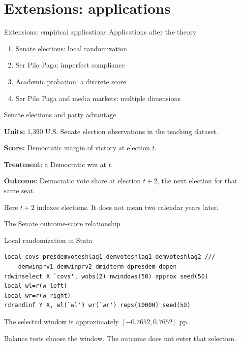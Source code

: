 \section{Extensions: applications}
\begin{frame}[plain]{Extensions: empirical applications}
\Large Applications after the theory
\vspace{1em}\normalsize
\begin{enumerate}\setlength{\itemsep}{.65em}
\item Senate elections: local randomization
\item Ser Pilo Paga: imperfect compliance
\item Academic probation: a discrete score
\item Ser Pilo Paga and media markets: multiple dimensions
\end{enumerate}
\end{frame}

\begin{frame}{Senate elections and party advantage}
\begin{items}
\item \textbf{Units:} 1,390 U.S. Senate election observations in the teaching dataset.
\item \textbf{Score:} Democratic margin of victory at election $t$.
\item \textbf{Treatment:} a Democratic win at $t$.
\item \textbf{Outcome:} Democratic vote share at election $t+2$, the next election for that same seat.
\item Here $t+2$ indexes elections. It does not mean two calendar years later.
\end{items}
\end{frame}

\begin{frame}{The Senate outcome-score relationship}
\end{frame}

\begin{frame}[fragile]{Local randomization in Stata}
\begin{lstlisting}
local covs presdemvoteshlag1 demvoteshlag1 demvoteshlag2 ///
    demwinprv1 demwinprv2 dmidterm dpresdem dopen
rdwinselect X `covs', wobs(2) nwindows(50) approx seed(50)
local wl=r(w_left)
local wr=r(w_right)
rdrandinf Y X, wl(`wl') wr(`wr') reps(10000) seed(50)
\end{lstlisting}
\begin{items}
\item The selected window is approximately $[-0.7652,0.7652]$ pp.
\item Balance tests choose the window. The outcome does not enter that selection.
\end{items}
\end{frame}

